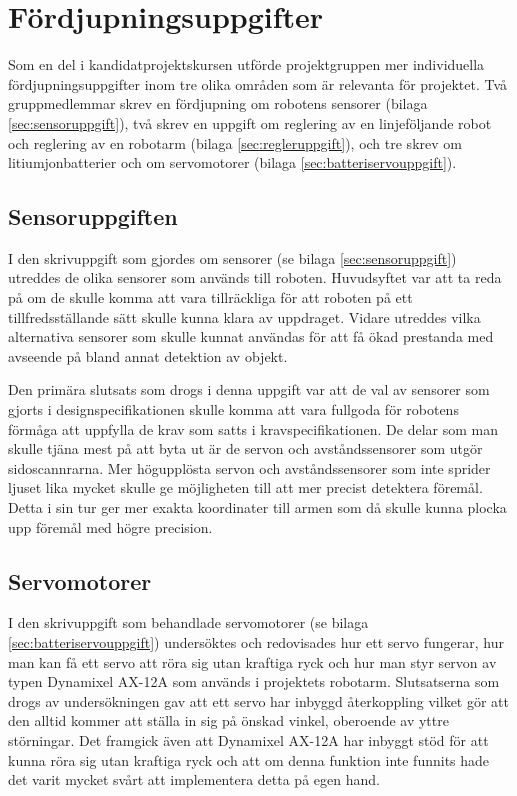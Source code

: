 

\section{Fördjupningsuppgifter}

Som en del i kandidatprojektskursen utförde projektgruppen mer individuella fördjupningsuppgifter inom tre olika områden som är relevanta för projektet. Två gruppmedlemmar skrev en fördjupning om robotens sensorer (bilaga \ref{sec:sensoruppgift}), två skrev en uppgift om reglering av en linjeföljande robot och reglering av en robotarm (bilaga \ref{sec:regleruppgift}), och tre skrev om litiumjonbatterier och om servomotorer (bilaga \ref{sec:batteriservouppgift}). 

\subsection{Sensoruppgiften}

I den skrivuppgift som gjordes om sensorer (se bilaga \ref{sec:sensoruppgift}) utreddes de olika sensorer som används till roboten. Huvudsyftet var att ta reda på om de skulle komma att vara tillräckliga för att roboten på ett tillfredsställande sätt skulle kunna klara av uppdraget. Vidare utreddes vilka alternativa sensorer som skulle kunnat användas för att få ökad prestanda med avseende på bland annat detektion av objekt. 

Den primära slutsats som drogs i denna uppgift var att de val av sensorer som gjorts i designspecifikationen skulle komma att vara fullgoda för robotens förmåga att uppfylla de krav som satts i kravspecifikationen. De delar som man skulle tjäna mest på att byta ut är de servon och avståndssensorer som utgör sidoscannrarna. Mer högupplösta servon och avståndssensorer som inte sprider ljuset lika mycket skulle ge möjligheten till att mer precist detektera föremål. Detta i sin tur ger mer exakta koordinater till armen som då skulle kunna plocka upp föremål med högre precision.

\subsection{Servomotorer}
I den skrivuppgift som behandlade servomotorer (se bilaga \ref{sec:batteriservouppgift}) undersöktes och redovisades hur ett servo fungerar, hur man kan få ett servo att röra sig utan kraftiga ryck och hur man styr servon av typen Dynamixel AX-12A som används i projektets robotarm. Slutsatserna som drogs av undersökningen gav att ett servo har inbyggd återkoppling vilket gör att den alltid kommer att ställa in sig på önskad vinkel, oberoende av yttre störningar. Det framgick även att  Dynamixel AX-12A har inbyggt stöd för att kunna röra sig utan kraftiga ryck och att om denna funktion inte funnits hade det varit mycket svårt att implementera detta på egen hand. 

